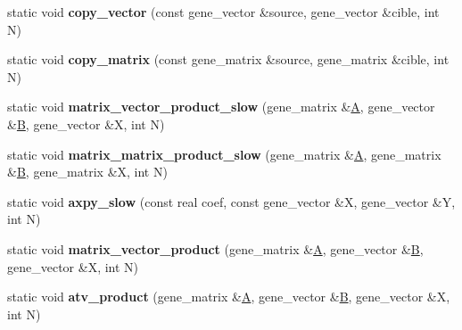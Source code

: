 \begin{DoxyCompactItemize}
static void {\bfseries copy\+\_\+vector} (const gene\+\_\+vector \&source, gene\+\_\+vector \&cible, int N)
\item 
\mbox{\label{classublas__interface_ab6feace7a007b3344072623229d3f738}} 
static void {\bfseries copy\+\_\+matrix} (const gene\+\_\+matrix \&source, gene\+\_\+matrix \&cible, int N)
\item 
\mbox{\label{classublas__interface_a858ac339249e698a4a6d9fb8b63765d3}} 
static void {\bfseries matrix\+\_\+vector\+\_\+product\+\_\+slow} (gene\+\_\+matrix \&\hyperlink{group___core___module_class_eigen_1_1_matrix}{A}, gene\+\_\+vector \&\hyperlink{group___core___module_class_eigen_1_1_matrix}{B}, gene\+\_\+vector \&X, int N)
\item 
\mbox{\label{classublas__interface_a0d59e21440e6b229c42871dcb6ab60ba}} 
static void {\bfseries matrix\+\_\+matrix\+\_\+product\+\_\+slow} (gene\+\_\+matrix \&\hyperlink{group___core___module_class_eigen_1_1_matrix}{A}, gene\+\_\+matrix \&\hyperlink{group___core___module_class_eigen_1_1_matrix}{B}, gene\+\_\+matrix \&X, int N)
\item 
\mbox{\label{classublas__interface_a2d6f83cc3d827e6e0d261b0f6f0fc225}} 
static void {\bfseries axpy\+\_\+slow} (const real coef, const gene\+\_\+vector \&X, gene\+\_\+vector \&Y, int N)
\item 
\mbox{\label{classublas__interface_a26e6c848c18676daf943250597f766c8}} 
static void {\bfseries matrix\+\_\+vector\+\_\+product} (gene\+\_\+matrix \&\hyperlink{group___core___module_class_eigen_1_1_matrix}{A}, gene\+\_\+vector \&\hyperlink{group___core___module_class_eigen_1_1_matrix}{B}, gene\+\_\+vector \&X, int N)
\item 
\mbox{\label{classublas__interface_a4dbd7324c682015d070141403b0710b8}} 
static void {\bfseries atv\+\_\+product} (gene\+\_\+matrix \&\hyperlink{group___core___module_class_eigen_1_1_matrix}{A}, gene\+\_\+vector \&\hyperlink{group___core___module_class_eigen_1_1_matrix}{B}, gene\+\_\+vector \&X, int N)
\item 
\mbox{\label{classublas__interface_ae931b23f3823fdd23dc3ef0feba08812}} 

\end{DoxyCompactItemize}
